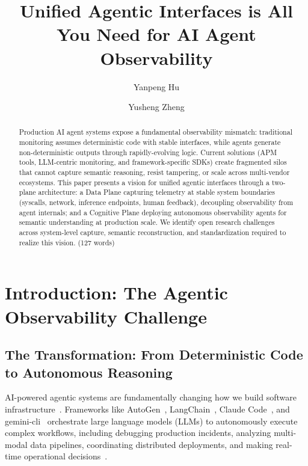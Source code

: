 \documentclass[sigplan,screen,9pt]{acmart}
\begin{document}
\title{Unified Agentic Interfaces is All You Need for AI Agent Observability}

\author{Yanpeng Hu}

\author{Yusheng Zheng}


\sloppy
\begin{abstract}
Production AI agent systems expose a fundamental observability mismatch: traditional monitoring assumes deterministic code with stable interfaces, while agents generate non-deterministic outputs through rapidly-evolving logic. Current solutions (APM tools, LLM-centric monitoring, and framework-specific SDKs) create fragmented silos that cannot capture semantic reasoning, resist tampering, or scale across multi-vendor ecosystems. This paper presents a vision for unified agentic interfaces through a two-plane architecture: a Data Plane capturing telemetry at stable system boundaries (syscalls, network, inference endpoints, human feedback), decoupling observability from agent internals; and a Cognitive Plane deploying autonomous observability agents for semantic understanding at production scale. We identify open research challenges across system-level capture, semantic reconstruction, and standardization required to realize this vision. (127 words)
\end{abstract}


\maketitle



\section{Introduction: The Agentic Observability Challenge}

\subsection{The Transformation: From Deterministic Code to Autonomous Reasoning}

AI-powered agentic systems are fundamentally changing how we build software infrastructure~\cite{wang2024survey,guo2024survey}. Frameworks like AutoGen~\cite{autogen}, LangChain~\cite{langchain}, Claude Code~\cite{claudecode}, and gemini-cli~\cite{geminicli} orchestrate large language models (LLMs) to autonomously execute complex workflows, including debugging production incidents, analyzing multi-modal data pipelines, coordinating distributed deployments, and making real-time operational decisions~\cite{tran2025survey}.
\end{document}
